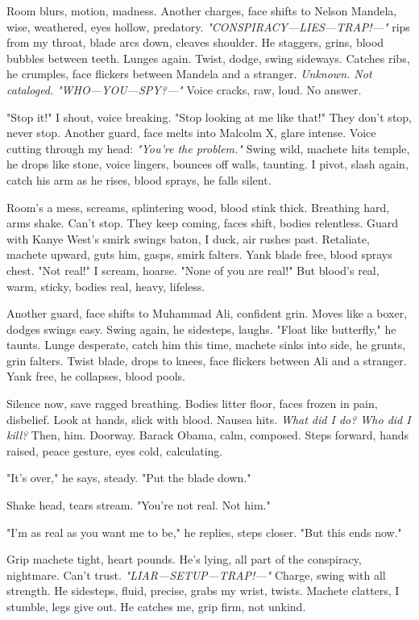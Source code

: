 \documentclass[12pt,oneside]{book} %
\begin{document}
Room blurs, motion, madness. Another charges, face shifts to \textnormal{Nelson Mandela}, wise, weathered, eyes hollow, predatory. \textit{"CONSPIRACY—LIES—TRAP!—"} rips from my throat, blade arcs down, cleaves shoulder. He staggers, grins, blood bubbles between teeth. Lunges again. Twist, dodge, swing sideways. Catches ribs, he crumples, face flickers between \textnormal{Mandela} and a stranger. \textit{Unknown. Not cataloged.} \textit{"WHO—YOU—SPY?—"} Voice cracks, raw, loud. No answer.

"Stop it!" I shout, voice breaking. "Stop looking at me like that!" They don’t stop, never stop. Another guard, face melts into \textnormal{Malcolm X}, glare intense. Voice cutting through my head: \textit{"You’re the problem."} Swing wild, machete hits temple, he drops like stone, voice lingers, bounces off walls, taunting. I pivot, slash again, catch his arm as he rises, blood sprays, he falls silent.

Room’s a mess, screams, splintering wood, blood stink thick. Breathing hard, arms shake. Can’t stop. They keep coming, faces shift, bodies relentless. Guard with \textnormal{Kanye West}’s smirk swings baton, I duck, air rushes past. Retaliate, machete upward, guts him, gasps, smirk falters. Yank blade free, blood sprays chest. "Not real!" I scream, hoarse. "None of you are real!" But blood’s real, warm, sticky, bodies real, heavy, lifeless.

Another guard, face shifts to \textnormal{Muhammad Ali}, confident grin. Moves like a boxer, dodges swings easy. Swing again, he sidesteps, laughs. "Float like butterfly," he taunts. Lunge desperate, catch him this time, machete sinks into side, he grunts, grin falters. Twist blade, drops to knees, face flickers between \textnormal{Ali} and a stranger. Yank free, he collapses, blood pools.

Silence now, save ragged breathing. Bodies litter floor, faces frozen in pain, disbelief. Look at hands, slick with blood. Nausea hits. \textit{What did I do? Who did I kill?} Then, him. Doorway. \textnormal{Barack Obama}, calm, composed. Steps forward, hands raised, peace gesture, eyes cold, calculating.

"It’s over," he says, steady. "Put the blade down."

Shake head, tears stream. "You’re not real. Not him."

"I’m as real as you want me to be," he replies, steps closer. "But this ends now."

Grip machete tight, heart pounds. He’s lying, all part of the conspiracy, nightmare. Can’t trust. \textit{"LIAR—SETUP—TRAP!—"} Charge, swing with all strength. He sidesteps, fluid, precise, grabs my wrist, twists. Machete clatters, I stumble, legs give out. He catches me, grip firm, not unkind.
\end{document}
